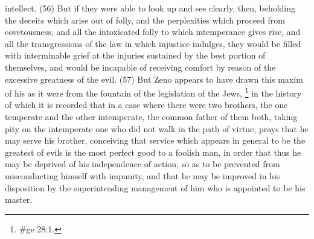 intellect. (56) But if they were able to look up and see clearly, then, beholding the deceits which
arise out of folly, and the perplexities which proceed from covetousness, and all the intoxicated
folly to which intemperance gives rise, and all the transgressions of the law in which injustice
indulges, they would be filled with interminable grief at the injuries sustained by the best portion of
themselves, and would be incapable of receiving comfort by reason of the excessive greatness of
the evil. (57) But Zeno appears to have drawn this maxim of his as it were from the fountain of the
legislation of the Jews, \footnote{\#ge 28:1.} in the history of which it is recorded that in a case where
there were two brothers, the one temperate and the other intemperate, the common father of them
both, taking pity on the intemperate one who did not walk in the path of virtue, prays that he may
serve his brother, conceiving that service which appears in general to be the greatest of evils is
the most perfect good to a foolish man, in order that thus he may be deprived of his independence
of action, so as to be prevented from misconducting himself with impunity, and that he may be
improved in his disposition by the superintending management of him who is appointed to be his
master.

